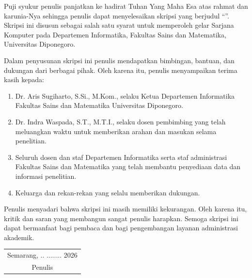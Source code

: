 Puji syukur penulis panjatkan ke hadirat Tuhan Yang Maha Esa atas rahmat dan karunia-Nya sehingga penulis dapat menyelesaikan skripsi yang berjudul ``\thejudul''. Skripsi ini disusun sebagai salah satu syarat untuk memperoleh gelar Sarjana Komputer pada Departemen Informatika, Fakultas Sains dan Matematika, Universitas Diponegoro.

Dalam penyusunan skripsi ini penulis mendapatkan bimbingan, bantuan, dan dukungan dari berbagai pihak. Oleh karena itu, penulis menyampaikan terima kasih kepada:
\begin{enumerate}
\item Dr. Aris Sugiharto, S.Si., M.Kom., selaku Ketua Departemen Informatika Fakultas Sains dan Matematika Universitas Diponegoro.
\item Dr. Indra Waspada, S.T., M.T.I., selaku dosen pembimbing yang telah meluangkan waktu untuk memberikan arahan dan masukan selama penelitian.
\item Seluruh dosen dan staf Departemen Informatika serta staf administrasi Fakultas Sains dan Matematika yang telah membantu penyediaan data dan informasi penelitian.
\item Keluarga dan rekan-rekan yang selalu memberikan dukungan.
\end{enumerate}

Penulis menyadari bahwa skripsi ini masih memiliki kekurangan. Oleh karena itu, kritik dan saran yang membangun sangat penulis harapkan. Semoga skripsi ini dapat bermanfaat bagi pembaca dan bagi pengembangan layanan administrasi akademik.

\vspace{12pt}
\hfill\begin{tabular}{c}
Semarang, .. ........ 2026\\[1.6cm]
Penulis
\end{tabular}
\clearpage
